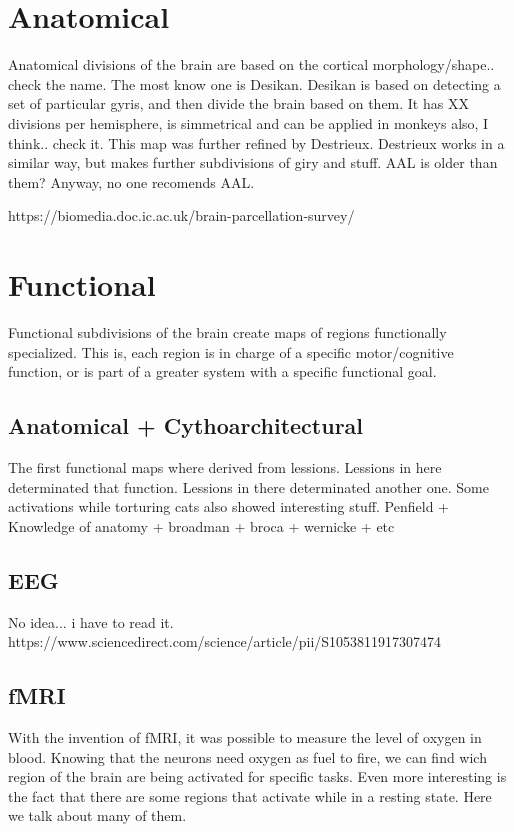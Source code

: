 \section{Anatomical}
Anatomical divisions of the brain are based on the cortical morphology/shape.. check the name.
The most know one is Desikan. Desikan is based on detecting a set of particular
gyris, and then divide the brain based on them. It has XX divisions per
hemisphere, is simmetrical and can be applied in monkeys also, I think.. check it.
This map was further refined by Destrieux. Destrieux works in a similar way,
but makes further subdivisions of giry and stuff. AAL is older than them?
Anyway, no one recomends AAL.

https://biomedia.doc.ic.ac.uk/brain-parcellation-survey/

\section{Functional}

Functional subdivisions of the brain create maps of regions functionally 
specialized. This is, each region is in charge of a specific motor/cognitive
function, or is part of a greater system with a specific functional goal.

\subsection{Anatomical + Cythoarchitectural}
The first functional maps where derived from lessions. Lessions in here
determinated that function. Lessions in there determinated another one.
Some activations while torturing cats also showed interesting stuff.
Penfield + Knowledge of anatomy + broadman + broca + wernicke + etc

\subsection{EEG}
No idea... i have to read it.
https://www.sciencedirect.com/science/article/pii/S1053811917307474

\subsection{fMRI}
With the invention of fMRI, it was possible to measure the level of oxygen
in blood. Knowing that the neurons need oxygen as fuel to fire, we can
find wich region of the brain are being activated for specific tasks.
Even more interesting is the fact that there are some regions that activate
while in a resting state. Here we talk about many of them.

